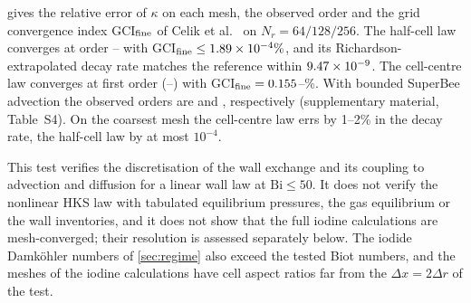  gives the relative error of $\kappa$ on each mesh, the
observed order and the grid convergence index GCI$_{\rm fine}$ of Celik
et al.\ \cite{Celik2008procedure} on $N_r=64/128/256$. The half-cell law
converges at order \GraetzOrderHalfMin--\GraetzOrderHalfMax{} with
GCI$_{\rm fine}\le1.89\times10^{-4}\%$, and its Richardson-extrapolated
decay rate matches the reference within $9.47\times10^{-9}$. The
cell-centre law converges at first order
(\GraetzOrderNoneMin--\GraetzOrderNoneMax) with
GCI$_{\rm fine}=0.155$--\GraetzGCINoneMax\%. With bounded
SuperBee advection the observed orders are \GraetzOrderSBHalf{} and
\GraetzOrderSBNone{}, respectively (supplementary material, Table~S4).
On the coarsest mesh the cell-centre law errs by 1--2\% in the decay
rate, the half-cell law by at most $10^{-4}$.
\begin{table}[tb]
\centering
\caption{Graetz--Robin verification ($\mathrm{Pe}_R=5$): relative error
$\kappa/\kappa_{\rm ref}-1$ of the fitted decay rate on $N_r$ radial cells,
observed order $p$ and GCI$_{\rm fine}$ \cite{Celik2008procedure} on
$N_r=64/128/256$, Gauss linear advection, zero-gradient outlet.
Half-cell series: \cref{eq:halfcell}; cell-centre value: kinetic law
without the half-cell resistance.}
\label{tab:graetz}
\small
\end{table}

This test verifies the discretisation of the wall exchange and its
coupling to advection and diffusion for a linear wall law at
$\mathrm{Bi}\le50$. It does not verify the nonlinear HKS law with
tabulated equilibrium pressures, the gas equilibrium or the wall
inventories, and it does not show that the full iodine calculations are
mesh-converged; their resolution is assessed separately below. The
iodide Damk\"ohler numbers of \cref{sec:regime} also exceed the tested
Biot numbers, and the meshes of the iodine calculations have cell
aspect ratios far from the $\Delta x=2\Delta r$ of the test.

